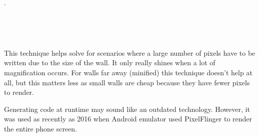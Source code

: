 .\\
\par
{}
\begin{minipage}{\textwidth}
 \centering
  \label{wolf3d_in_pink}
\vspace*{0.5cm}\\

\end{minipage}


\par

\begin{minipage}{\textwidth}
 \centering
  \label{wolf3d_in_pink2}
 \vspace*{0.5cm}\\
\end{minipage}
This technique helps solve for scenarios where a large number of pixels have to be written due to the size of the wall. It only really shines when a lot of magnification occurs. For walls far away (minified) this technique doesn't help at all, but this matters less as small walls are cheap because they have fewer pixels
to render.\\
\par
{} Generating code at runtime may sound like an outdated technology. However, it was used as recently as 2016 when Android emulator used PixelFlinger to render the entire phone screen.





















